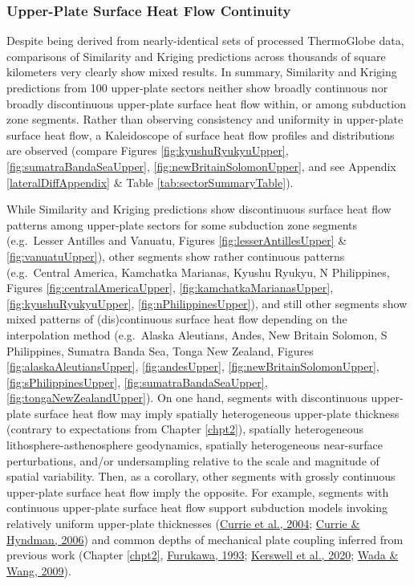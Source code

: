 \hypertarget{upper-plate-surface-heat-flow-continuity}{%
\subsubsection{Upper-Plate Surface Heat Flow Continuity}\label{upper-plate-surface-heat-flow-continuity}}

Despite being derived from nearly-identical sets of processed ThermoGlobe data, comparisons of Similarity and Kriging predictions across thousands of square kilometers very clearly show mixed results. In summary, Similarity and Kriging predictions from 100 upper-plate sectors neither show broadly continuous nor broadly discontinuous upper-plate surface heat flow within, or among subduction zone segments. Rather than observing consistency and uniformity in upper-plate surface heat flow, a Kaleidoscope of surface heat flow profiles and distributions are observed (compare Figures \ref{fig:kyushuRyukyuUpper}, \ref{fig:sumatraBandaSeaUpper}, \ref{fig:newBritainSolomonUpper}, and see Appendix \ref{lateralDiffAppendix} \& Table \ref{tab:sectorSummaryTable}).

While Similarity and Kriging predictions show discontinuous surface heat flow patterns among upper-plate sectors for some subduction zone segments (e.g.~Lesser Antilles and Vanuatu, Figures \ref{fig:lesserAntillesUpper} \& \ref{fig:vanuatuUpper}), other segments show rather continuous patterns (e.g.~Central America, Kamchatka Marianas, Kyushu Ryukyu, N Philippines, Figures \ref{fig:centralAmericaUpper}, \ref{fig:kamchatkaMarianasUpper}, \ref{fig:kyushuRyukyuUpper}, \ref{fig:nPhilippinesUpper}), and still other segments show mixed patterns of (dis)continuous surface heat flow depending on the interpolation method (e.g.~Alaska Aleutians, Andes, New Britain Solomon, S Philippines, Sumatra Banda Sea, Tonga New Zealand, Figures \ref{fig:alaskaAleutiansUpper}, \ref{fig:andesUpper}, \ref{fig:newBritainSolomonUpper}, \ref{fig:sPhilippinesUpper}, \ref{fig:sumatraBandaSeaUpper}, \ref{fig:tongaNewZealandUpper}). On one hand, segments with discontinuous upper-plate surface heat flow may imply spatially heterogeneous upper-plate thickness (contrary to expectations from Chapter \ref{chpt2}), spatially heterogeneous lithosphere-asthenosphere geodynamics, spatially heterogeneous near-surface perturbations, and/or undersampling relative to the scale and magnitude of spatial variability. Then, as a corollary, other segments with grossly continuous upper-plate surface heat flow imply the opposite. For example, segments with continuous upper-plate surface heat flow support subduction models invoking relatively uniform upper-plate thicknesses (\protect\hyperlink{ref-currie2004}{Currie et al., 2004}; \protect\hyperlink{ref-currie2006}{Currie \& Hyndman, 2006}) and common depths of mechanical plate coupling inferred from previous work (Chapter \ref{chpt2}, \protect\hyperlink{ref-furukawa1993}{Furukawa, 1993}; \protect\hyperlink{ref-kerswell2020}{Kerswell et al., 2020}; \protect\hyperlink{ref-wada2009}{Wada \& Wang, 2009}).

